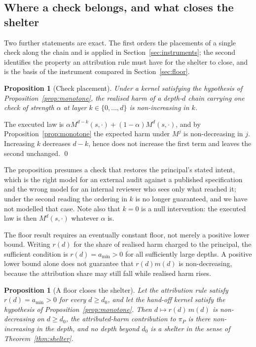 \documentclass[a4paper,fleqn]{cas-sc}
\newtheorem{proposition}[theorem]{Proposition}
\newcommand{\piP}{\pi_{P}}
\begin{document}
\subsection{Where a check belongs, and what closes the shelter}
\label{sec:checks}

Two further statements are exact. The first orders the placements of a single
check along the chain and is applied in Section~\ref{sec:instruments}; the
second identifies the property an attribution rule must have for the shelter to
close, and is the basis of the instrument compared in Section~\ref{sec:floor}.

\begin{proposition}[Check placement]
\label{prop:audit}
Under a kernel satisfying the hypothesis of Proposition~\ref{prop:monotone},
the realised harm of a depth-$d$ chain carrying one check of strength $\alpha$
at layer $k\in\{0,\dots,d\}$ is non-increasing in $k$.
\end{proposition}

\begin{pf}
The executed law is $\alpha M^{d-k}(s,\cdot)+(1-\alpha)M^{d}(s,\cdot)$, and by
Proposition~\ref{prop:monotone} the expected harm under $M^{j}$ is
non-decreasing in $j$. Increasing $k$ decreases $d-k$, hence does not increase
the first term and leaves the second unchanged. \qed
\end{pf}

The proposition presumes a check that restores the principal's stated intent,
which is the right model for an external audit against a published
specification and the wrong model for an internal reviewer who sees only what
reached it; under the second reading the ordering in $k$ is no longer
guaranteed, and we have not modelled that case. Note also that $k=0$ is a null
intervention: the executed law is then $M^{d}(s,\cdot)$ whatever $\alpha$ is.

The floor result requires an eventually constant floor, not merely a positive
lower bound. Writing $r(d)$ for the share of realised harm charged to the
principal, the sufficient condition is $r(d)=a_{\min}>0$ for all sufficiently
large depths. A positive lower bound alone does not guarantee that
$r(d)m(d)$ is non-decreasing, because the attribution share may still fall
while realised harm rises.

\begin{proposition}[A floor closes the shelter]
\label{prop:floor}
Let the attribution rule satisfy $r(d)=a_{\min}>0$ for every $d\ge d_{0}$, and
let the hand-off kernel satisfy the hypothesis of
Proposition~\ref{prop:monotone}. Then $d\mapsto r(d)\,m(d)$ is non-decreasing
on $d\ge d_{0}$, the attributed-harm contribution to $\piP$ is there
non-increasing in the depth, and no depth beyond $d_{0}$ is a shelter in the
sense of Theorem~\ref{thm:shelter}.
\end{proposition}
\end{document}
